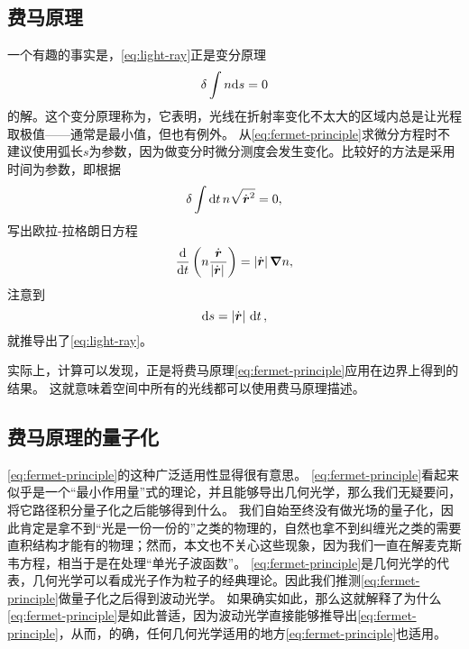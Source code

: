 \subsection{费马原理}

一个有趣的事实是，\eqref{eq:light-ray}正是变分原理
\begin{equation}
    \var \int n \dd s = 0
    \label{eq:fermet-principle}
\end{equation}
的解。这个变分原理称为，它表明，光线在折射率变化不太大的区域内总是让光程取极值——通常是最小值，但也有例外。
从\eqref{eq:fermet-principle}求微分方程时不建议使用弧长$s$为参数，因为做变分时微分测度会发生变化。比较好的方法是采用时间为参数，即根据
\[
    \var \int \dd{t} n \sqrt{\dot{\vb*{r}}^2} = 0,
\]
写出欧拉-拉格朗日方程
\[
    \dv{t}\left( n \frac{\dot{\vb*{r}}}{\abs*{\dot{\vb*{r}}}} \right) = \abs*{\dot{\vb*{r}}} \grad{n},
\]
注意到
\[
    \dd{s} = \abs*{\dot{\vb*{r}}} \dd{t},
\]
就推导出了\eqref{eq:light-ray}。

实际上，计算可以发现，正是将费马原理\eqref{eq:fermet-principle}应用在边界上得到的结果。
这就意味着空间中所有的光线都可以使用费马原理描述。

\subsection{费马原理的量子化}

\eqref{eq:fermet-principle}的这种广泛适用性显得很有意思。
\eqref{eq:fermet-principle}看起来似乎是一个“最小作用量”式的理论，并且能够导出几何光学，那么我们无疑要问，将它路径积分量子化之后能够得到什么。
我们自始至终没有做光场的量子化，因此肯定是拿不到“光是一份一份的”之类的物理的，自然也拿不到纠缠光之类的需要直积结构才能有的物理；然而，本文也不关心这些现象，因为我们一直在解麦克斯韦方程，相当于是在处理“单光子波函数”。
\eqref{eq:fermet-principle}是几何光学的代表，几何光学可以看成光子作为粒子的经典理论。因此我们推测\eqref{eq:fermet-principle}做量子化之后得到波动光学。
如果确实如此，那么这就解释了为什么\eqref{eq:fermet-principle}是如此普适，因为波动光学直接能够推导出\eqref{eq:fermet-principle}，从而，的确，任何几何光学适用的地方\eqref{eq:fermet-principle}也适用。

